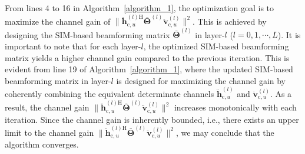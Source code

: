\documentclass[lettersize,journal]{IEEEtran}
\theoremstyle{remark}
\begin{document}
From lines 4 to 16 in Algorithm~\ref{algorithm_1}, the optimization goal is to maximize the channel gain of $\|\ddot{\mathbf{h}}_{\mathrm{c},u}^{(l)\mathrm{H}}
\overline{\mathbf{\Theta}}^{(l)}\ddot{\mathbf{v}}_{\mathrm{c},u}^{(l)}\|^2$. This is achieved by designing the SIM-based beamforming matrix $\overline{\mathbf{\Theta}}^{(l)}$ in layer-$l$ ($l=0,1,\cdots,L$). It is important to note that for each layer-$l$, the optimized SIM-based beamforming matrix yields a higher channel gain compared to the previous iteration. This is evident from line 19 of Algorithm~\ref{algorithm_1}, where the updated SIM-based beamforming matrix in layer-$l$ is designed for maximizing the channel gain by coherently combining the equivalent determinate channels $\ddot{\mathbf{h}}_{\mathrm{c},u}^{(l)}$ and $\ddot{\mathbf{v}}_{\mathrm{c},u}^{(l)}$. As a result, the channel gain $\|\ddot{\mathbf{h}}_{\mathrm{c},u}^{(l)\mathrm{H}}
\overline{\mathbf{\Theta}}^{(l)}\ddot{\mathbf{v}}_{\mathrm{c},u}^{(l)}\|^2$ increases monotonically with each iteration. Since the channel gain is inherently bounded, i.e., there exists an upper limit to the channel gain $\|\ddot{\mathbf{h}}_{\mathrm{c},u}^{(l)\mathrm{H}}
\overline{\mathbf{\Theta}}^{(l)}\ddot{\mathbf{v}}_{\mathrm{c},u}^{(l)}\|^2$, we may conclude that the algorithm converges.
\end{document}
